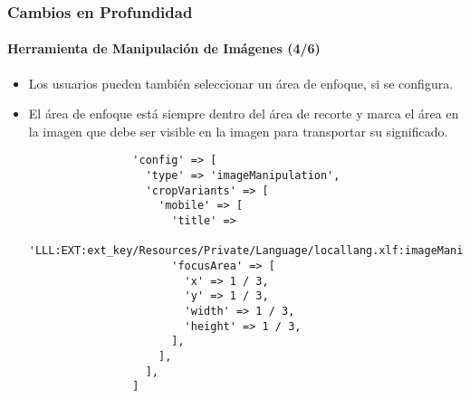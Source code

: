 \begin{frame}[fragile]
	\frametitle{Cambios en Profundidad}
	\framesubtitle{Herramienta de Manipulación de Imágenes (4/6)}

	\lstset{basicstyle=\tiny\ttfamily}

	\begin{itemize}
		\item Los usuarios pueden también seleccionar un área de enfoque, si se configura.
		\item El área de enfoque está siempre dentro del área de recorte y marca el área en la imagen
			que debe ser visible en la imagen para transportar su significado.

			\begin{lstlisting}
				'config' => [
				  'type' => 'imageManipulation',
				  'cropVariants' => [
				    'mobile' => [
				      'title' =>
				        'LLL:EXT:ext_key/Resources/Private/Language/locallang.xlf:imageManipulation.mobile',
				      'focusArea' => [
				        'x' => 1 / 3,
				        'y' => 1 / 3,
				        'width' => 1 / 3,
				        'height' => 1 / 3,
				      ],
				    ],
				  ],
				]
			\end{lstlisting}

	\end{itemize}

\end{frame}


